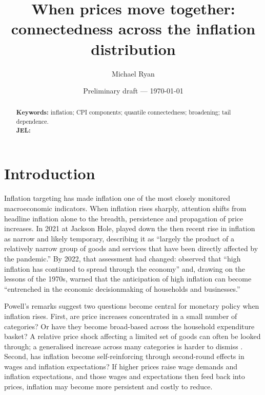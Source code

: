 \documentclass{article}
\title{When prices move together: connectedness across the inflation distribution}
\author[a]{Michael Ryan}
\affil[a]{School of Accounting, Finance and Economics, University of Waikato, Hamilton, New Zealand.
Email: michael.ryan@waikato.ac.nz}
\date{Preliminary draft --- \today}
\begin{document}
\maketitle


\begin{abstract}
 
 
 
\noindent\textbf{Keywords:} inflation; CPI components; quantile connectedness; broadening; tail dependence. \\
\noindent\textbf{JEL:}  
\end{abstract}

\section{Introduction}\label{sec:intro}

Inflation targeting has made inflation one of the most closely monitored
macroeconomic indicators. When inflation rises sharply, attention shifts from
headline inflation alone to the breadth, persistence and propagation of price
increases. In 2021 at Jackson Hole, \citet{Powell2021} played down the then recent rise in
inflation as narrow and likely temporary, describing it as ``largely the product
of a relatively narrow group of goods and services that have been directly
affected by the pandemic.'' By 2022, that assessment had changed:
\citet{Powell2022JH} observed that ``high inflation has continued to spread
through the economy'' and, drawing on the lessons of the 1970s, warned that the
anticipation of high inflation can become ``entrenched in the economic
decisionmaking of households and businesses.'' 

Powell's remarks suggest two questions become central for monetary policy when inflation rises. First, are price
increases concentrated in a small number of categories? Or have they become
broad-based across the household expenditure basket? A relative price shock affecting a
limited set of goods can often be looked through; a generalised increase across
many categories is harder to dismiss \citep{bryan1994measuring}. Second, has
inflation become self-reinforcing through second-round effects in wages and
inflation expectations? If higher prices raise wage demands and inflation
expectations, and those wages and expectations then feed back into prices,
inflation may become more persistent and costly to reduce.
\end{document}
